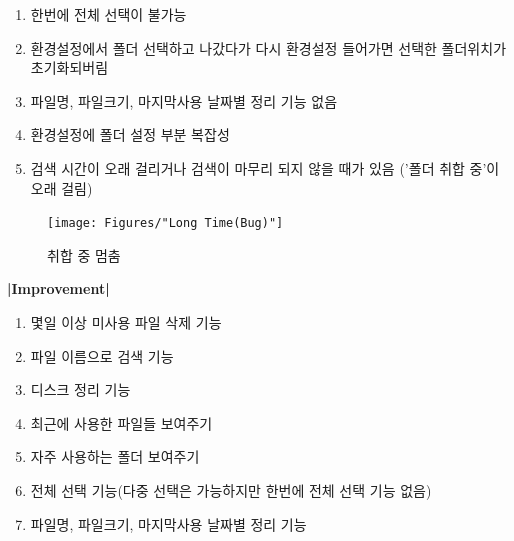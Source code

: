 \documentclass[a4paper, 13pt]{article} %
\begin{document}
		\begin{enumerate}
		\large \item 한번에 전체 선택이 불가능 \newline
		
		\item 환경설정에서 폴더 선택하고 나갔다가 다시 환경설정 들어가면
		선택한 폴더위치가 초기화되버림 \newline
		
		\item 파일명, 파일크기, 마지막사용 날짜별 정리 기능 없음 \newline
		
		\item 환경설정에 폴더 설정 부분 복잡성 \newline
		
		\item 검색 시간이 오래 걸리거나 검색이 마무리 되지 않을 때가 있음
		('폴더 취합 중'이 오래 걸림) \newline \newline
		
	\end{enumerate}
		
		\begin{figure}[h]
			
			\centering
			
			\texttt{[image: Figures/"Long Time(Bug)"]}
			
			\caption{취합 중 멈춤}
			
			\label{fig:long-time}
			
		\end{figure}
		
		\newpage
		
		\bf \LARGE |Improvement| \newline
		
		\begin{enumerate}
		
		\large \item 몇일 이상 미사용 파일 삭제 기능 \newline
		
		\item 파일 이름으로 검색 기능 \newline
		
		\item 디스크 정리 기능 \newline
		
		\item 최근에 사용한 파일들 보여주기 \newline
		
		\item 자주 사용하는 폴더 보여주기 \newline
		
		\item 전체 선택 기능(다중 선택은 가능하지만 한번에 전체 선택 기능 없음) \newline
		
		\item 파일명, 파일크기, 마지막사용 날짜별 정리 기능
		\end{enumerate}
\end{document}
